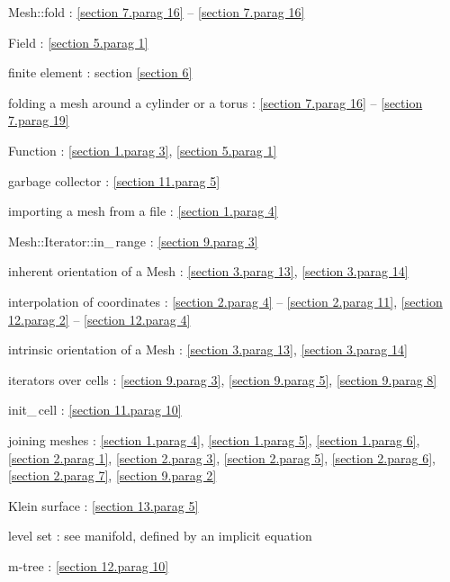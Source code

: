 \documentclass[a4paper]{scrreprt}
\def\numb{}
\newcommand\verm[1]{\textcolor{manif}{#1}}
\renewcommand\tt{\normalfont\ttfamily}
\begin{document}
\noindent
{\small\tt\verm{Mesh}::fold} :
\ref{\numb section 7.\numb parag 16} -- \ref{\numb section 7.\numb parag 16}

\noindent
{\small\tt \verm{Field}} : \ref{\numb section 5.\numb parag 1}

\noindent
finite element : section \ref{\numb section 6}

\noindent
folding a mesh around a cylinder or a torus : \ref{\numb section 7.\numb parag 16} --
\ref{\numb section 7.\numb parag 19}

\noindent
{\small\tt \verm{Function}} : \ref{\numb section 1.\numb parag 3},
\ref{\numb section 5.\numb parag 1}

\noindent
garbage collector : \ref{\numb section 11.\numb parag 5}

\noindent
importing a mesh from a file : \ref{\numb section 1.\numb parag 4}

\noindent
{\small\tt\verm{Mesh}::Iterator::in\_\,range} : \ref{\numb section 9.\numb parag 3}

\noindent
inherent orientation of a {\small\tt\verm{Mesh}} : \ref{\numb section 3.\numb parag 13},
\ref{\numb section 3.\numb parag 14}

\noindent
interpolation of coordinates :
\ref{\numb section 2.\numb parag 4} -- \ref{\numb section 2.\numb parag 11},
\ref{\numb section 12.\numb parag 2} -- \ref{\numb section 12.\numb parag 4}

\noindent
intrinsic orientation of a {\small\tt\verm{Mesh}} : \ref{\numb section 3.\numb parag 13},
\ref{\numb section 3.\numb parag 14}

\noindent
iterators over cells : \ref{\numb section 9.\numb parag 3}, \ref{\numb section 9.\numb parag 5},
\ref{\numb section 9.\numb parag 8}

\noindent
{\small\tt init\_\,cell} : \ref{\numb section 11.\numb parag 10}

\noindent
{\small\tt join}ing meshes : \ref{\numb section 1.\numb parag 4},
\ref{\numb section 1.\numb parag 5}, \ref{\numb section 1.\numb parag 6},
\ref{\numb section 2.\numb parag 1}, \ref{\numb section 2.\numb parag 3},
\ref{\numb section 2.\numb parag 5}, \ref{\numb section 2.\numb parag 6},
\ref{\numb section 2.\numb parag 7}, \ref{\numb section 9.\numb parag 2}

\noindent
Klein surface : \ref{\numb section 13.\numb parag 5}

\noindent
level set : see manifold, defined by an implicit equation

\noindent
m-tree : \ref{\numb section 12.\numb parag 10}
\end{document}
